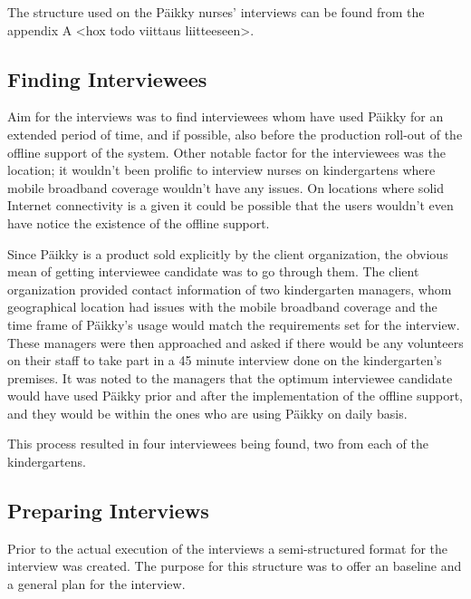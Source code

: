 The structure used on the Päikky nurses' interviews can be found from the appendix A <hox todo viittaus liitteeseen>. %



\subsection{Finding Interviewees}

Aim for the interviews was to find interviewees whom have used Päikky for an extended period of time, and if possible, also before the production roll-out of the offline support of the system. Other notable factor for the interviewees was the location; it wouldn't been prolific to interview nurses on kindergartens where mobile broadband coverage wouldn't have any issues. On locations where solid Internet connectivity is a given it could be possible that the users wouldn't even have notice the existence of the offline support.

Since Päikky is a product sold explicitly by the client organization, the obvious mean of getting interviewee candidate was to go through them. The client organization provided contact information of two kindergarten managers, whom geographical location had issues with the mobile broadband coverage and the time frame of Päikky's usage would match the requirements set for the interview. These managers were then approached and asked if there would be any volunteers on their staff to take part in a 45 minute interview done on the kindergarten's premises. It was noted to the managers that the optimum interviewee candidate would have used Päikky prior and after the implementation of the offline support, and they would be within the ones who are using Päikky on daily basis.

This process resulted in four interviewees being found, two from each of the kindergartens. 




\subsection{Preparing Interviews}
Prior to the actual execution of the interviews a semi-structured format for the interview was created. The purpose for this structure was to offer an baseline and a general plan for the interview. 

